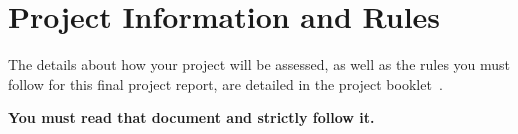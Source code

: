 \documentclass[]{final_report}
\begin{document}
\chapter{Project Information and Rules}

The details about how your project will be assessed, as well as the rules you must follow for this final project report, are detailed in the project booklet~\cite{COHEN:2013}.

\textbf{You must read that document and strictly follow it.}


\newpage



\label{endpage}
\end{document}
